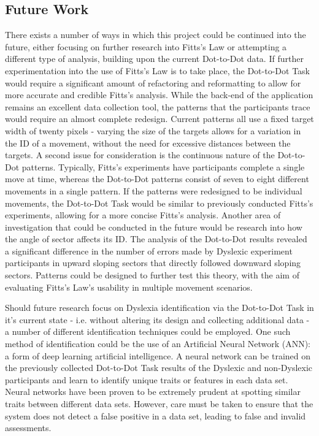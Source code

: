 	\subsection{Future Work}
		There exists a number of ways in which this project could be continued into the future, either focusing on further research into Fitts’s Law or attempting a different type of analysis, building upon the current Dot-to-Dot data.
		If further experimentation into the use of Fitts’s Law is to take place, the Dot-to-Dot Task would require a significant amount of refactoring and reformatting to allow for more accurate and credible Fitts’s analysis. While the back-end of the application remains an excellent data collection tool, the patterns that the participants trace would require an almost complete redesign. Current patterns all use a fixed target width of twenty pixels - varying the size of the targets allows for a variation in the ID of a movement, without the need for excessive distances between the targets. 
		A second issue for consideration is the continuous nature of the Dot-to-Dot patterns. Typically, Fitts’s experiments have participants complete a single move at time, whereas the Dot-to-Dot patterns consist of seven to eight different movements in a single pattern. If the patterns were redesigned to be individual movements, the Dot-to-Dot Task would be similar to previously conducted Fitts’s experiments, allowing for a more concise Fitts’s analysis.
		Another area of investigation that could be conducted in the future would be research into how the angle of sector affects its ID. The analysis of the Dot-to-Dot results revealed a significant difference in the number of  errors made by Dyslexic experiment participants in upward sloping sectors that directly followed downward sloping sectors. Patterns could be designed to further test this theory, with the aim of evaluating Fitts’s Law’s usability in multiple movement scenarios.
		
		Should future research focus on Dyslexia identification via the Dot-to-Dot Task in it’s current state - i.e. without altering its design and collecting additional data - a number of different identification techniques could be employed. One such method of identification could be the use of an Artificial Neural Network (ANN): a form of  deep learning artificial intelligence. A neural network can be trained on the previously collected Dot-to-Dot Task results of the Dyslexic and non-Dyslexic participants and learn to identify unique traits or features in each data set. Neural networks have been proven to be extremely prudent at spotting similar traits between different data sets. However, care must be taken to ensure that the system does not detect a false positive in a data set, leading to false and invalid assessments.
		
